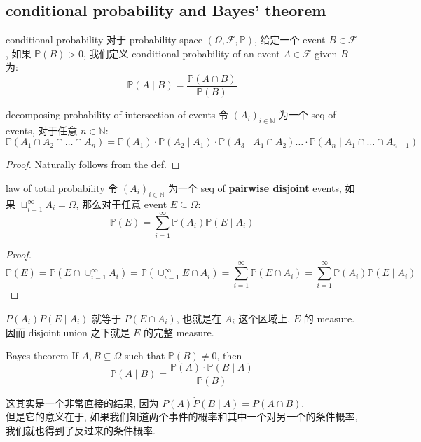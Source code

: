 \subsection{conditional probability and Bayes' theorem}
\begin{definition}{conditional probability}
    对于 probability space \((\Omega, \mathcal{F}, \mathbb{P})\), 给定一个 event $B \in \mathcal{F}$, 如果 \(\mathbb{P}(B) > 0\), 我们定义 conditional probability of an event $A \in \mathcal{F}$ given $B$ 为:
    \[
    \mathbb{P}(A \mid B) = \frac{\mathbb{P}(A \cap B)}{\mathbb{P}(B)}
    \]
\end{definition}
\begin{proposition}{decomposing probability of intersection of events}   
    令 $\left(A_i\right)_{i \in \mathbb{N}}$ 为一个 seq of events, 对于任意 $n \in \mathbb{N}$:
    \[
    \mathbb{P}\left(A_1 \cap A_2 \cap \ldots \cap A_n\right)=\mathbb{P}\left(A_1\right) \cdot \mathbb{P}\left(A_2 \mid A_1\right) \cdot \mathbb{P}\left(A_3 \mid A_1 \cap A_2\right) \ldots \cdot \mathbb{P}\left(A_n \mid A_1 \cap \ldots \cap A_{n-1}\right)
    \]
\end{proposition}
\begin{proof}
Naturally follows from the def. 
\end{proof}


\begin{theorem}{law of total probability}
    令 $\left(A_i\right)_{i \in \mathbb{N}}$ 为一个 seq of \textbf{pairwise disjoint} events, 如果 $\sqcup_{i=1}^{\infty} A_i=\Omega$, 那么对于任意 event $E \subseteq \Omega$:
    \[
    \mathbb{P}(E)=\sum_{i=1}^{\infty} \mathbb{P}\left(A_i\right) \mathbb{P}\left(E \mid A_i\right)
    \]
\end{theorem}
\begin{proof}
    \[
    \mathbb{P}(E)=\mathbb{P}\left(E \cap \cup_{i=1}^{\infty} A_i\right)=\mathbb{P}\left(\cup_{i=1}^{\infty} E \cap A_i\right)=\sum_{i=1}^{\infty} \mathbb{P}\left(E \cap A_i\right)=\sum_{i=1}^{\infty} \mathbb{P}\left(A_i\right) \mathbb{P}\left(E \mid A_i\right)
    \]
\end{proof}
\begin{remark}
    \(P(A_i)P(E\mid A_i)\) 就等于 \(P(E \cap A_i)\), 也就是在 \(A_i\) 这个区域上, \(E\) 的 measure. 因而 disjoint union 之下就是 \(E\) 的完整 measure.
\end{remark}

\begin{theorem}{Bayes theorem}
    If $A, B \subseteq \Omega$ such that $\mathbb{P}(B) \neq 0$, then
    \[
    \mathbb{P}(A \mid B)=\frac{\mathbb{P}(A) \cdot \mathbb{P}(B \mid A)}{\mathbb{P}(B)}
    \]
\end{theorem}
\begin{remark}
    这其实是一个非常直接的结果, 因为 \(P(A) \dot P(B \mid A) = P(A \cap B)\). \\
    但是它的意义在于, 如果我们知道两个事件的概率和其中一个对另一个的条件概率, 我们就也得到了反过来的条件概率.
\end{remark}



